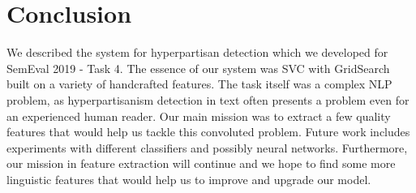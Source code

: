 \section{Conclusion}
\label{sec:conclusion}

We described the system for hyperpartisan detection which we developed for SemEval 2019 - Task 4.  The essence of our system was SVC with GridSearch built on a variety of handcrafted features. The task itself was a complex NLP problem, as hyperpartisanism detection in text often presents a problem even for an experienced human reader. Our main mission was to extract a few quality features that would help us tackle this convoluted problem. Future work includes experiments with different classifiers and possibly neural networks. Furthermore, our mission in feature extraction will continue and we hope to find some more linguistic features that would help us to improve and upgrade our model.